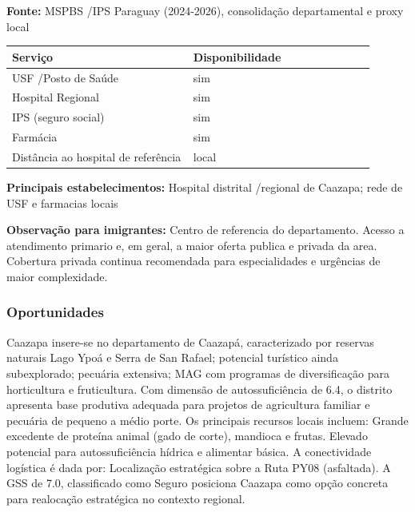 \textbf{Fonte:} MSPBS /\allowbreak  IPS Paraguay (2024-2026), consolidação
departamental e proxy local

{\def\LTcaptype{none} %
\begin{longtable}{@{}>{\raggedright\arraybackslash}p{0.45\linewidth} >{\raggedright\arraybackslash}p{0.45\linewidth}@{}}
\toprule\noalign{}
Serviço & Disponibilidade \\
\midrule\noalign{}
\endhead
\bottomrule\noalign{}
\endlastfoot
USF /\allowbreak  Posto de Saúde & sim \\
Hospital Regional & sim \\
IPS (seguro social) & sim \\
Farmácia & sim \\
Distância ao hospital de referência & local \\
\end{longtable}
}

\textbf{Principais estabelecimentos:} Hospital distrital /\allowbreak  regional de
Caazapa; rede de USF e farmacias locais

\textbf{Observação para imigrantes:} Centro de referencia do
departamento. Acesso a atendimento primario e, em geral, a maior oferta
publica e privada da area. Cobertura privada continua recomendada para
especialidades e urgências de maior complexidade.
\newpage

\subsubsection*{Oportunidades}\label{oport-caazapa-0601}
Caazapa insere-se no departamento de Caazapá, caracterizado por reservas naturais Lago Ypoá e Serra de San Rafael; potencial turístico ainda subexplorado; pecuária extensiva; MAG com programas de diversificação para horticultura e fruticultura. Com dimensão de autossuficiência de 6.4, o distrito apresenta base produtiva adequada para projetos de agricultura familiar e pecuária de pequeno a médio porte. Os principais recursos locais incluem: Grande excedente de proteína animal (gado de corte), mandioca e frutas. Elevado potencial para autossuficiência hídrica e alimentar básica. A conectividade logística é dada por: Localização estratégica sobre a Ruta PY08 (asfaltada). A GSS de 7.0, classificado como Seguro posiciona Caazapa como opção concreta para realocação estratégica no contexto regional.

